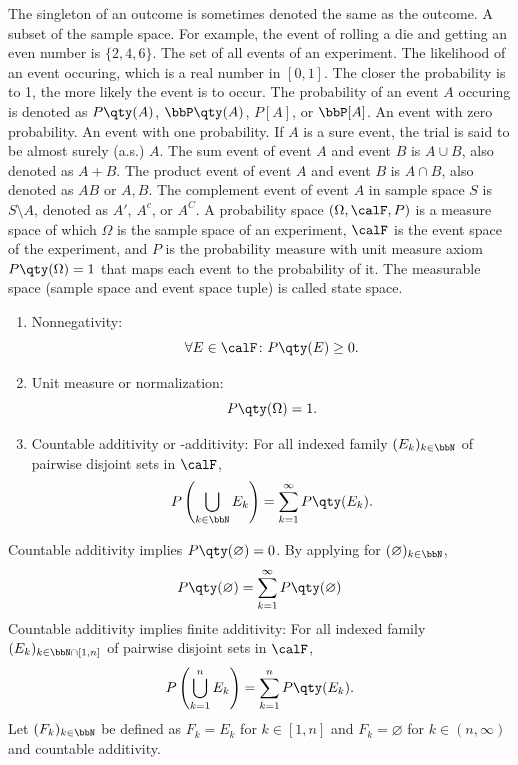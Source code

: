\documentclass[a4paper,12pt]{report}
\begin{document}
The singleton of an outcome is sometimes denoted the same as the outcome.
A subset of the sample space. For example, the event of rolling a die and getting an even number is $\{2, 4, 6\}$.
The set of all events of an experiment.
The likelihood of an event occuring, which is a real number in $[0,1]$. The closer the probability is to 1, the more likely the event is to occur. The probability of an event $A$ occuring is denoted as $P\qty(A)$, $\bbP\qty(A)$, $P[A]$, or $\bbP[A]$.
An event with zero probability.
An event with one probability. If $A$ is a sure event, the trial is said to be almost surely (a.s.) $A$.
The sum event of event $A$ and event $B$ is $A\cup B$, also denoted as $A+B$.
The product event of event $A$ and event $B$ is $A\cap B$, also denoted as $AB$ or $A,B$.
The complement event of event $A$ in sample space $S$ is $S\setminus A$, denoted as $A'$, $A^c$, or $A^C$.
A probability space $(\Omega,\calF,P)$ is a measure space of which $\Omega$ is the sample space of an experiment, $\calF$ is the event space of the experiment, and $P$ is the probability measure with unit measure axiom $P\qty(\Omega)=1$ that maps each event to the probability of it. The measurable space (sample space and event space tuple) is called state space.
\begin{enumerate}
\item Nonnegativity:
\[\forall E\in\calF\colon P\qty(E)\geq 0.\]
\item Unit measure or normalization:
\[P\qty(\Omega)=1.\]
\item Countable additivity or \text{\textsigma}-additivity: For all indexed family $(E_k)_{k\in\bbN}$ of pairwise disjoint sets in $\calF$,
\[P\left(\bigcup_{k\in\bbN}E_k\right)=\sum_{k=1}^\infty P\qty(E_k).\]
\end{enumerate}
Countable additivity implies $P\qty(\varnothing)=0$.
\bpr
By applying for $(\varnothing)_{k\in\bbN}$,
\[P\qty(\varnothing)=\sum_{k=1}^{\infty}P\qty(\varnothing)\]
\epr
Countable additivity implies finite additivity: For all indexed family $(E_k)_{k\in\bbN\cap[1,n]}$ of pairwise disjoint sets in $\calF$,
\[P\left(\bigcup_{k=1}^nE_k\right)=\sum_{k=1}^nP\qty(E_k).\]
\bpr
Let $(F_k)_{k\in\bbN}$ be defined as $F_k=E_k$ for $k\in[1,n]$ and $F_k=\varnothing$ for $k\in(n,\infty)$ and countable additivity.
\end{document}
